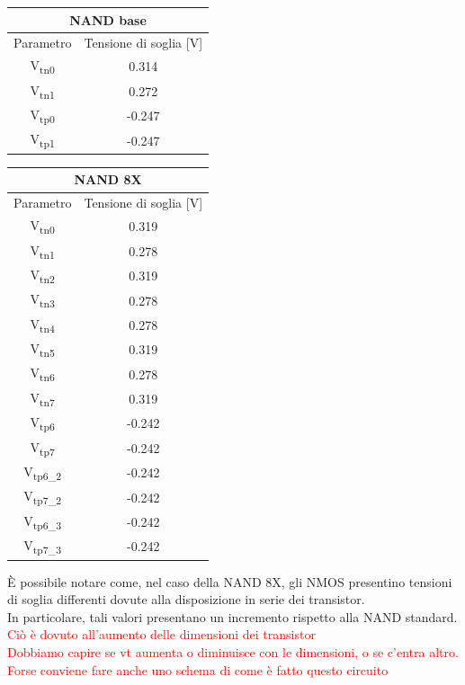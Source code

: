 \documentclass[11pt,  english, makeidx, a4paper, titlepage, oneside]{book}
\begin{document}
\begin{center}
	\begin{tabular}{|c|c|}
	\hline
	 \multicolumn{2}{c}{NAND base} \\
	\hline
	Parametro & Tensione di soglia [V] \\
	\hline
	 V\textsubscript{tn0} & 0.314\\
	\hline
	 V\textsubscript{tn1} & 0.272 \\
	\hline
	V\textsubscript{tp0} & -0.247 \\
	\hline
	V\textsubscript{tp1} & -0.247 \\
	\hline
	\end{tabular}	
	\begin{tabular}{|c|c|}
	\hline
	 \multicolumn{2}{c}{NAND 8X} \\
	\hline
	Parametro & Tensione di soglia [V] \\
	\hline
	 V\textsubscript{tn0} & 0.319\\
	\hline
	 V\textsubscript{tn1} & 0.278 \\
	 \hline
	 V\textsubscript{tn2} & 0.319 \\
	 \hline
	 V\textsubscript{tn3} & 0.278 \\
	 \hline
	 V\textsubscript{tn4} & 0.278 \\
	 \hline
	 V\textsubscript{tn5} & 0.319 \\
	 \hline
	 V\textsubscript{tn6} & 0.278 \\
	\hline
	 V\textsubscript{tn7} & 0.319 \\
	 \hline
	V\textsubscript{tp6} & -0.242 \\
	\hline
	V\textsubscript{tp7} & -0.242 \\
	\hline
	V\textsubscript{tp6\_2} & -0.242 \\
	\hline
	V\textsubscript{tp7\_2} & -0.242 \\
	\hline
	V\textsubscript{tp6\_3} & -0.242 \\
	\hline
	V\textsubscript{tp7\_3} & -0.242 \\
	\hline
	\end{tabular}	
\end{center}
\vspace{0.3cm}
È possibile notare come, nel caso della NAND 8X, gli NMOS presentino tensioni di soglia differenti dovute alla disposizione in serie dei transistor.
\\
In particolare, tali valori presentano un incremento rispetto alla NAND standard. \textcolor{red}{Ciò è dovuto all'aumento delle dimensioni dei transistor
\\
Dobbiamo capire se vt aumenta o diminuisce con le dimensioni, o se c'entra altro. Forse conviene fare anche uno schema di come è fatto questo circuito}
\end{document}
